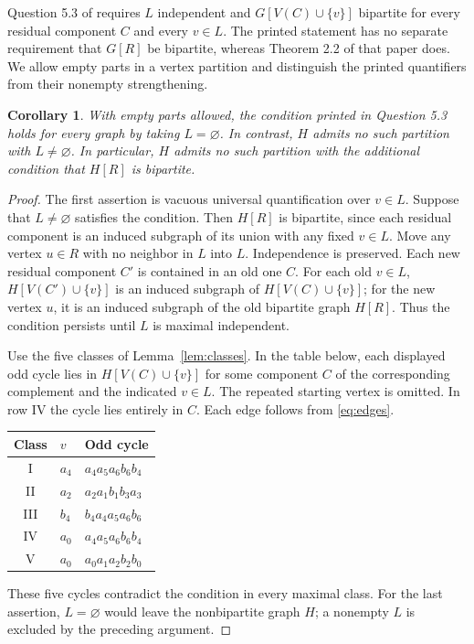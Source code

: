 \documentclass[11pt]{article}
\newtheorem{corollary}{Corollary}
\begin{document}
Question 5.3 of \cite[Section 5]{hausmann} requires $L$ independent
and $G[V(C)\cup\{v\}]$ bipartite for every residual component $C$
and every $v\in L$. The printed statement has no separate requirement
that $G[R]$ be bipartite, whereas Theorem 2.2 of that paper does.
We allow empty parts in a vertex partition and distinguish the printed
quantifiers from their nonempty strengthening.

\begin{corollary}\label{cor:neighbor}
With empty parts allowed, the condition printed in Question 5.3 holds
for every graph by taking $L=\varnothing$. In contrast, $H$ admits no
such partition with $L\ne\varnothing$. In particular, $H$ admits no
such partition with the additional condition that $H[R]$ is bipartite.
\end{corollary}
\begin{proof}
The first assertion is vacuous universal quantification over $v\in L$.
Suppose that $L\ne\varnothing$ satisfies the condition. Then $H[R]$
is bipartite, since each residual component is an induced subgraph
of its union with any fixed $v\in L$.
Move any vertex $u\in R$ with no neighbor in $L$ into $L$.
Independence is preserved. Each new residual component $C'$ is contained
in an old one $C$. For each old $v\in L$, $H[V(C')\cup\{v\}]$ is
an induced subgraph of $H[V(C)\cup\{v\}]$; for the new vertex $u$,
it is an induced subgraph of the old bipartite graph $H[R]$.
Thus the condition persists until $L$ is maximal independent.

Use the five classes of Lemma~\ref{lem:classes}. In the table below,
each displayed odd cycle lies in $H[V(C)\cup\{v\}]$ for some
component $C$ of the corresponding complement and the indicated $v\in L$.
The repeated starting vertex is omitted. In row IV the cycle lies
entirely in $C$. Each edge follows from \eqref{eq:edges}.
\begin{center}
\small
\begin{tabular}{@{}cll@{}}
\toprule
Class & $v$ & Odd cycle\\
\midrule
I & $a_4$ & $a_4a_5a_6b_6b_4$\\
II & $a_2$ & $a_2a_1b_1b_3a_3$\\
III & $b_4$ & $b_4a_4a_5a_6b_6$\\
IV & $a_0$ & $a_4a_5a_6b_6b_4$\\
V & $a_0$ & $a_0a_1a_2b_2b_0$\\
\bottomrule
\end{tabular}
\end{center}
These five cycles contradict the condition in every maximal class.
For the last assertion, $L=\varnothing$ would leave the nonbipartite
graph $H$; a nonempty $L$ is excluded by the preceding argument.
\end{proof}
\end{document}

